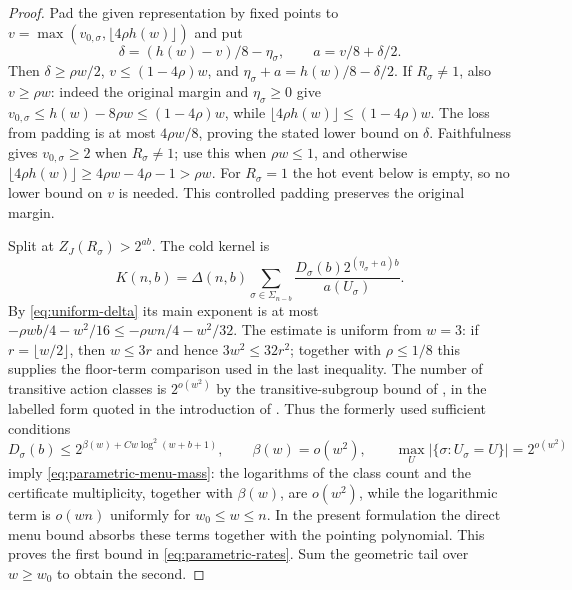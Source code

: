 \begin{proof}
Pad the given representation by fixed points to
$v=\max(v_{0,\sigma},\lfloor4\rho h(w)\rfloor)$ and put
\[
 \delta=(h(w)-v)/8-\eta_\sigma,\qquad a=v/8+\delta/2.
\]
Then $\delta\geq\rho w/2$, $v\leq(1-4\rho)w$, and
$\eta_\sigma+a=h(w)/8-\delta/2$. If $R_\sigma\ne1$, also
$v\geq\rho w$: indeed the original margin and $\eta_\sigma\geq0$ give
$v_{0,\sigma}\leq h(w)-8\rho w\leq(1-4\rho)w$, while
$\lfloor4\rho h(w)\rfloor\leq(1-4\rho)w$.
The loss from padding is at most $4\rho w/8$, proving the stated lower
bound on $\delta$. Faithfulness gives $v_{0,\sigma}\geq2$ when
$R_\sigma\ne1$; use this
when $\rho w\leq1$, and otherwise
$\lfloor4\rho h(w)\rfloor\geq4\rho w-4\rho-1>\rho w$.
For $R_\sigma=1$ the hot event below is empty, so no lower bound on $v$ is
needed. This controlled padding preserves the original margin.

Split at $Z_J(R_\sigma)>2^{ab}$. The cold kernel is
\[
 K(n,b)=\Delta(n,b)\sum_{\sigma\in\Sigma_{n-b}}
         \frac{D_\sigma(b)2^{(\eta_\sigma+a)b}}{a(U_\sigma)}.
\]
By \eqref{eq:uniform-delta} its main exponent is at most
$-\rho wb/4-w^2/16\leq-\rho wn/4-w^2/32$.
The estimate is uniform from $w=3$: if $r=\lfloor w/2\rfloor$, then
$w\leq3r$ and hence $3w^2\leq32r^2$; together with
$\rho\leq1/8$ this supplies the floor-term comparison used in the last
inequality.
The number of transitive action classes is $2^{o(w^2)}$ by the
transitive-subgroup bound of \cite{LucchiniMenegazzoMorigi2000}, in
the labelled form quoted in the introduction of
\cite{RoneyDougalTracey2025}. Thus the formerly used sufficient
conditions
\[
 D_\sigma(b)\leq2^{\beta(w)+Cw\log^2(w+b+1)},
 \qquad \beta(w)=o(w^2),\qquad
 \max_U|\{\sigma:U_\sigma=U\}|=2^{o(w^2)}
\]
imply \eqref{eq:parametric-menu-mass}: the logarithms of the class count
and the certificate multiplicity, together with $\beta(w)$, are $o(w^2)$,
while the logarithmic term is $o(wn)$ uniformly for
$w_0\leq w\leq n$. In the present formulation the direct menu bound
absorbs these terms together with the pointing polynomial. This proves
the first bound in \eqref{eq:parametric-rates}. Sum the geometric tail
over $w\geq w_0$ to obtain the second.


\end{proof}
